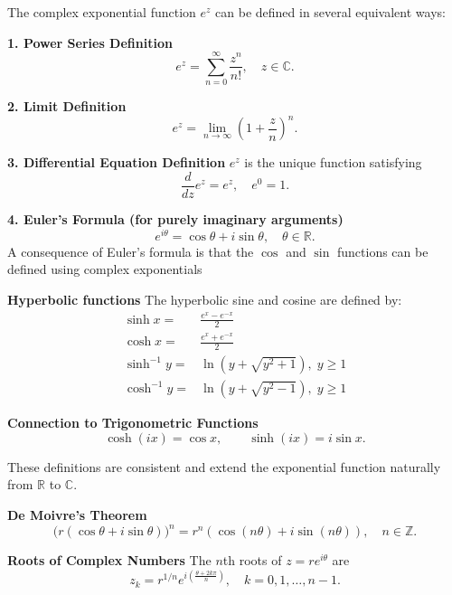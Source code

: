 \begin{highlight}
      The complex exponential function $e^z$ can be defined in several equivalent ways:

      \textbf{1. Power Series Definition}
      \[
      e^z = \sum_{n=0}^\infty \frac{z^n}{n!}, \quad z\in\mathbb{C}.
      \]

      \textbf{2. Limit Definition}
      \[
      e^z = \lim_{n \to \infty} \left(1 + \frac{z}{n}\right)^n.
      \]

      \textbf{3. Differential Equation Definition}
      $e^z$ is the unique function satisfying
      \[
      \frac{d}{dz} e^z = e^z, \quad e^0 = 1.
      \]

      \textbf{4. Euler’s Formula (for purely imaginary arguments)}
      \[
      e^{i\theta} = \cos\theta + i\sin\theta, \quad \theta \in \mathbb{R}.
      \]
      A consequence of Euler's formula is that the \(\cos\) and \(\sin\) 
      functions can be defined using complex exponentials
        

      \textbf{Hyperbolic functions}
      The hyperbolic sine and cosine are defined by:
      \begin{align*}
      \sinh x =& \frac{e^x - e^{-x}}{2}\\
      \cosh x =& \frac{e^x + e^{-x}}{2}\\
      \sinh^{-1} y =& \ln\!\left(y + \sqrt{y^2+1}\right), \; y \geq 1\\
      \cosh^{-1} y =& \ln\!\left(y + \sqrt{y^2-1}\right), \; y \geq 1
      \end{align*}

      \textbf{Connection to Trigonometric Functions}
      \[
      \cosh(ix) = \cos x, 
      \qquad 
      \sinh(ix) = i \sin x.
      \]


      These definitions are consistent and extend the exponential function naturally from $\mathbb{R}$ to $\mathbb{C}$.

      \textbf{De Moivre's Theorem}
      \[
      \big(r(\cos\theta+i\sin\theta)\big)^n = r^n(\cos(n\theta)+i\sin(n\theta)), \quad n \in \mathbb{Z}.
      \]

      \textbf{Roots of Complex Numbers}
      The $n$th roots of $z=re^{i\theta}$ are
      \[
      z_k = r^{1/n} e^{i\left(\frac{\theta+2k\pi}{n}\right)}, \quad k=0,1,\dots,n-1.
      \]
    \end{highlight}


